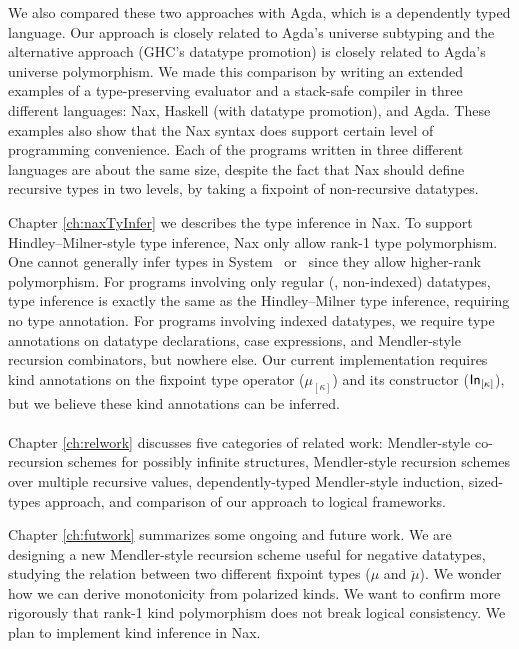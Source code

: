 We also compared these two approaches with Agda, which
is a dependently typed language. Our approach is closely related to
Agda's universe subtyping and the alternative approach
(GHC's datatype promotion) is closely related to
Agda's universe polymorphism. We made this comparison by writing an extended
examples of a type-preserving evaluator and a stack-safe compiler
in three different languages: Nax, Haskell (with datatype promotion), and Agda.
These examples also show that the Nax syntax does support certain level of
programming convenience. Each of the programs written in three different
languages are about the same size, despite the fact that Nax should define
recursive types in two levels, by taking a fixpoint of non-recursive datatypes.

Chapter \ref{ch:naxTyInfer} we describes the type inference in Nax.
To support Hindley--Milner-style type inference, Nax only
allow rank-1 type polymorphism. One cannot generally infer types
in System \Fi\ or \Fixi\ since they allow higher-rank polymorphism.
For programs involving only regular (\ie, non-indexed) datatypes,
type inference is exactly the same as the Hindley--Milner type inference,
requiring no type annotation. For programs involving indexed datatypes,
we require type annotations on datatype declarations, case expressions, and
Mendler-style recursion combinators, but nowhere else.
Our current implementation requires kind annotations on
the fixpoint type operator ($\mu_{[\kappa]}$) and its constructor
($\mathsf{In}_{[\kappa]}$), but we believe these kind annotations can be inferred.

\paragraph{}
Chapter \ref{ch:relwork} discusses five categories of related work:
Mendler-style co-recursion schemes for possibly infinite structures,
Mendler-style recursion schemes over multiple recursive values,
dependently-typed Mendler-style induction, sized-types approach,
and comparison of our approach to logical frameworks.

Chapter \ref{ch:futwork} summarizes some ongoing and future work.
We are designing a new Mendler-style recursion scheme useful
for negative datatypes, studying the relation between two different
fixpoint types ($\mu$ and $\breve\mu$). We wonder how we can derive
monotonicity from polarized kinds. We want to confirm more rigorously
that rank-1 kind polymorphism does not break logical consistency.
We plan to implement kind inference in Nax.

